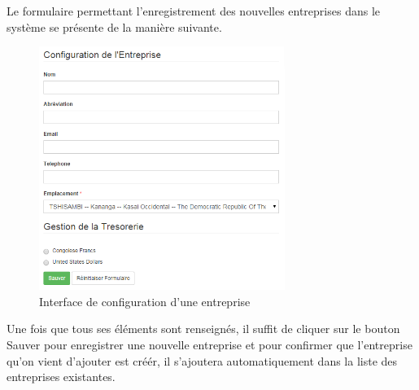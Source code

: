 \documentclass[12pt,a4paper]{report}
\begin{document}
Le formulaire permettant l'enregistrement des nouvelles entreprises dans le système se présente de la manière suivante.
\begin{figure}[h]
\begin{center}
\includegraphics[width=8cm]{pic/Config_entreprise.png}
\end{center}
\caption{Interface de configuration d'une entreprise}
\label{Interface principale de la gestion des utilisateurs}
\end{figure} 

Une fois que tous ses éléments sont renseignés, il suffit de cliquer sur le bouton Sauver pour enregistrer une nouvelle entreprise et pour confirmer que l'entreprise qu'on vient d'ajouter est créér, il s'ajoutera automatiquement dans la liste des entreprises existantes. 
\end{document}
